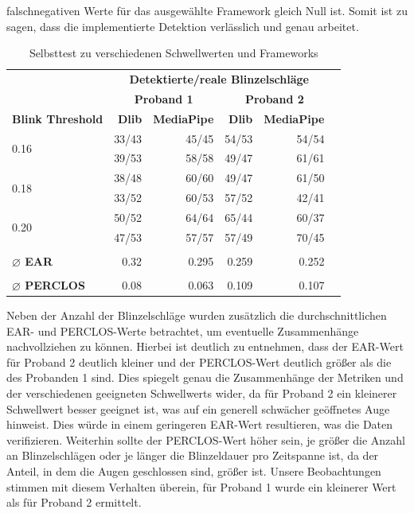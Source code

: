 falschnegativen Werte für das ausgewählte Framework gleich Null ist. Somit ist zu sagen, dass die implementierte Detektion verlässlich und genau arbeitet. 

\begin{table}[!htp]\centering
	\scriptsize
	\begin{tabular}{lrrrrr}%
		&\multicolumn{4}{c}{\textbf{Detektierte/reale Blinzelschläge}} \\\cmidrule{2-5}
		&\multicolumn{2}{c}{\textbf{Proband 1}} &\multicolumn{2}{c}{\textbf{Proband 2}} \\\cmidrule{2-5}
		\textbf{Blink Threshold} &\textbf{Dlib} &\textbf{MediaPipe} &\textbf{Dlib} &\textbf{MediaPipe} \\\midrule
		\multirow{2}{*}{0.16} &33/43 &45/45 &54/53 &54/54 \\
		&39/53 &58/58 &49/47 &61/61 \\
		\multirow{2}{*}{0.18} &38/48 &60/60 &49/47 &61/50 \\
		&33/52 &60/53 &57/52 &42/41 \\
		\multirow{2}{*}{0.20} &50/52 &64/64 &65/44 &60/37 \\
		&47/53 &57/57 &57/49 &70/45 \\
		& & & & \\
		\textbf{$\varnothing$ EAR} &0.32 &0.295 &0.259 &0.252 \\
		& & & & \\
		\textbf{$\varnothing$ PERCLOS} &0.08 &0.063 &0.109 &0.107 \\
	\end{tabular}
	\caption{Selbsttest zu verschiedenen Schwellwerten und Frameworks}\label{table:selbsttest}
\end{table}

Neben der Anzahl der Blinzelschläge wurden zusätzlich die durchschnittlichen EAR- und PERCLOS-Werte betrachtet, um eventuelle Zusammenhänge nachvollziehen zu können. Hierbei ist deutlich zu entnehmen, dass der EAR-Wert für Proband 2 deutlich kleiner und der PERCLOS-Wert deutlich größer als die des Probanden 1 sind. Dies spiegelt genau die Zusammenhänge der Metriken und der verschiedenen geeigneten Schwellwerts wider, da für Proband 2 ein kleinerer Schwellwert besser geeignet ist, was auf ein generell schwächer geöffnetes Auge hinweist. Dies würde in einem geringeren EAR-Wert resultieren, was die Daten verifizieren. Weiterhin sollte der PERCLOS-Wert höher sein, je größer die Anzahl an Blinzelschlägen oder je länger die Blinzeldauer pro Zeitspanne ist, da der Anteil, in dem die Augen geschlossen sind, größer ist. Unsere Beobachtungen stimmen mit diesem Verhalten überein, für Proband 1 wurde ein kleinerer Wert als für Proband 2 ermittelt.

